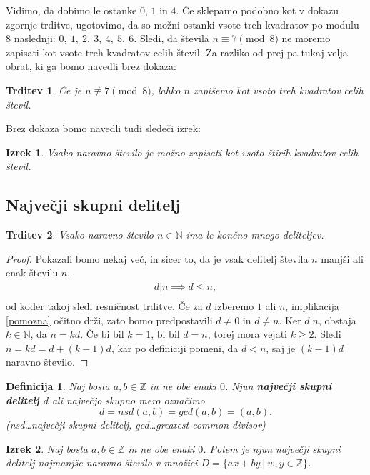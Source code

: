 \documentclass[12pt, a4paper]{article}
\newtheorem{defi}{Definicija}
\newtheorem{trd}{Trditev}
\newtheorem{izr}{Izrek}
\begin{document}
Vidimo, da dobimo le ostanke $0$, $1$ in $4$. Če sklepamo podobno kot v dokazu zgornje trditve, ugotovimo, da so možni ostanki vsote treh kvadratov po modulu $8$ naslednji: $0,\ 1,\ 2,\ 3,\ 4,\ 5,\ 6$. Sledi, da števila $n\equiv 7 \pmod8$ ne moremo zapisati kot vsote treh kvadratov celih števil. Za razliko od prej pa tukaj velja obrat, ki ga bomo navedli brez dokaza:

\begin{trd}
Če je $n\not\equiv 7 \pmod 8$, lahko $n$ zapišemo kot vsoto treh kvadratov celih števil.
\end{trd}

Brez dokaza bomo navedli tudi sledeči izrek:
\begin{izr}
Vsako naravno število je možno zapisati kot vsoto štirih kvadratov celih števil.
\end{izr}

\subsection{Največji skupni delitelj}

\begin{trd}
Vsako naravno število $n\in \mathbb{N}$ ima le končno mnogo deliteljev.
\end{trd}

\begin{proof}
Pokazali bomo nekaj več, in sicer to, da je vsak delitelj števila $n$ manjši ali enak številu $n$,
\begin{align*}
d|n \implies d\leq n, \tag{$\ast$}\label{pomozna}\\
\end{align*}
od koder takoj sledi resničnost trditve. Če za $d$ izberemo $1$ ali $n$, implikacija \eqref{pomozna} očitno drži, zato bomo predpostavili $d\neq 0$ in $d\neq n$. Ker $d|n$, obstaja $k\in \mathbb{N}$, da $n=kd$. Če bi bil $k=1$, bi bil $d=n$, torej mora vejati $k\geq 2$. Sledi $n=kd=d + (k-1)d$, kar po definiciji pomeni, da $d<n$, saj je $(k-1)d$ naravno število.
\end{proof}

\begin{defi}
Naj bosta $a,b\in \mathbb{Z}$ in ne obe enaki $0$. Njun \textbf{največji skupni delitelj $d$} ali največjo skupno mero označimo $$d=nsd(a,b)=gcd(a,b)=(a,b).$$ (nsd\dots največji skupni delitelj, gcd\dots greatest common divisor)
\end{defi}

\begin{izr}
Naj bosta $a,b\in \mathbb{Z}$ in ne obe enaki $0$. Potem je njun največji skupni delitelj najmanjše naravno število v množici $D=\{ ax+by \ | \ w,y\in \mathbb{Z}\}$.
\end{izr}
\end{document}
